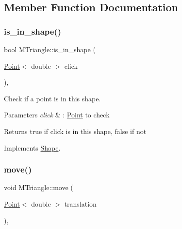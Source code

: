 \subsection{Member Function Documentation}
\mbox{\label{classMTriangle_a8d3d737a903823bf1a631cbb004a799c}} 
\subsubsection{\texorpdfstring{is\+\_\+in\+\_\+shape()}{is\_in\_shape()}}
{\footnotesize\ttfamily bool M\+Triangle\+::is\+\_\+in\+\_\+shape (\begin{DoxyParamCaption}\item[{\hyperlink{classPoint}{Point}$<$ double $>$}]{click }\end{DoxyParamCaption})\hspace{0.3cm}{\ttfamily [override]}, {\ttfamily [virtual]}}



Check if a point is in this shape. 


\begin{DoxyParams}{Parameters}
{\em click} & \+: \hyperlink{classPoint}{Point} to check \\
\hline
\end{DoxyParams}
\begin{DoxyReturn}{Returns}
true if click is in this shape, false if not 
\end{DoxyReturn}


Implements \hyperlink{classShape_abcce23128cd35989468a88a7194152af}{Shape}.

\mbox{\label{classMTriangle_a1b029feefcf7e3febcdae179557b4c2e}} 
\subsubsection{\texorpdfstring{move()}{move()}}
{\footnotesize\ttfamily void M\+Triangle\+::move (\begin{DoxyParamCaption}\item[{\hyperlink{classPoint}{Point}$<$ double $>$}]{translation }\end{DoxyParamCaption})\hspace{0.3cm}{\ttfamily [override]}, {\ttfamily [virtual]}}




